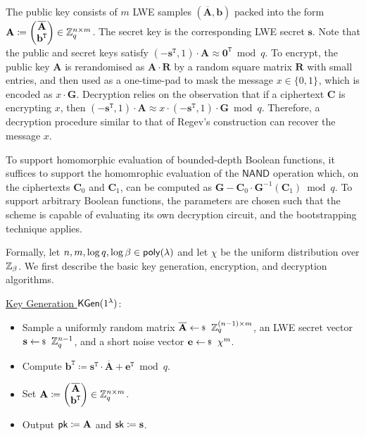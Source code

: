 \documentclass[10pt,twoside]{article}
\newcommand{\bits}[1][]{\{0,1\}^{#1}}
\renewcommand{\vec}[1]{\mathbf{#1}}
\newcommand{\mat}[1]{\mathbf{#1}}
\newcommand{\transpose}{\mathtt{T}}
\renewcommand{\NAND}{\mathsf{NAND}}
\begin{document}
The public key consists of $m$ LWE samples $(\overline{\mat{A}}, \vec{b})$ packed into the form $\mat{A} \coloneqq
\begin{pmatrix}
    \overline{\mat{A}} \\
    \vec{b}^\transpose
\end{pmatrix} \in \ZZ_q^{n \times m}$.
The secret key is the corresponding LWE secret $\vec{s}$.
Note that the public and secret keys satisfy $(-\vec{s}^\transpose, 1) \cdot \mat{A} \approx \vec{0}^\transpose \bmod q$.
To encrypt, the public key $\mat{A}$ is rerandomised as $\mat{A} \cdot \mat{R}$ by a random square matrix $\mat{R}$ with small entries, and then used as a one-time-pad to mask the message $x \in \bits$, which is encoded as $x \cdot \mat{G}$.
Decryption relies on the observation that if a ciphertext $\mat{C}$ is encrypting $x$, then $(-\vec{s}^\transpose, 1) \cdot \mat{A} \approx x \cdot (-\vec{s}^\transpose, 1) \cdot \mat{G} \bmod q$.
Therefore, a decryption procedure similar to that of Regev's construction can recover the message $x$.

To support homomorphic evaluation of bounded-depth Boolean functions, it suffices to support the homomrophic evaluation of the $\NAND$ operation which, on the ciphertexts $\mat{C}_0$ and $\mat{C}_1$, can be computed as $\mat{G} - \mat{C}_0 \cdot \mat{G}^{-1}(\mat{C}_1) \bmod q$.
To support arbitrary Boolean functions, the parameters are chosen such that the scheme is capable of evaluating its own decryption circuit, and the bootstrapping technique applies.

Formally, let $n,m,\log q, \log \beta \in \poly$ and let $\chi$ be the uniform distribution over $\mathbb{Z}_\beta$.
We first describe the basic key generation, encryption, and decryption algorithms.

\noindent\underline{Key Generation $\mathsf{KGen}(1^{\lambda})$}:
\begin{itemize}
    \item Sample a uniformly random matrix $\overline{\mat{A}} \sample \ZZ_q^{(n-1) \times m}$,
    an LWE secret vector $\vec{s} \sample \ZZ_q^{n-1}$,
    and a short noise vector $\vec{e} \sample \chi^{m}$.
    \item Compute $\vec{b}^\transpose \coloneqq \vec{s}^\transpose \cdot \overline{\mat{A}} + \vec{e}^\transpose \bmod q$.
    \item Set $\mat{A} \coloneqq
    \begin{pmatrix}
        \overline{\mat{A}} \\
        \vec{b}^\transpose
    \end{pmatrix} \in \ZZ_q^{n \times m}$.
    \item Output $\pk \coloneqq \mat{A}$ and $\sk \coloneqq \vec{s}$.
\end{itemize}
\end{document}
